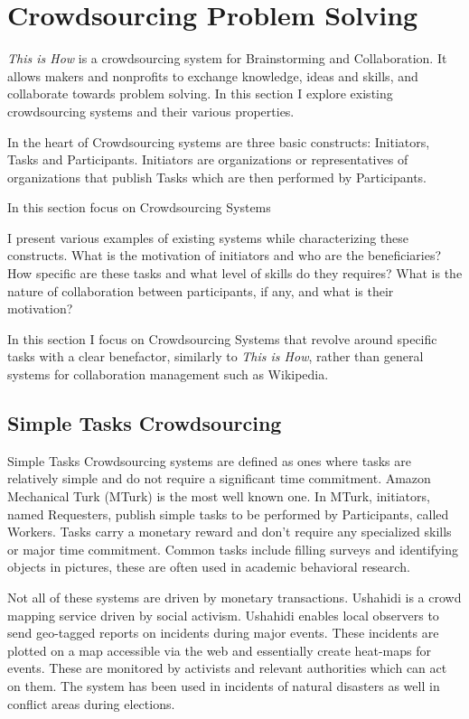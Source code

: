 \section{Crowdsourcing Problem Solving}

\textit{This is How} is a crowdsourcing system for Brainstorming and Collaboration. It allows makers and nonprofits to exchange knowledge, ideas and skills, and collaborate towards problem solving. In this section I explore existing crowdsourcing systems and their various properties.

In the heart of Crowdsourcing systems are three basic constructs: Initiators, Tasks and Participants. Initiators are organizations or representatives of organizations that publish Tasks which are then performed by Participants. 

In this section focus on Crowdsourcing Systems 

I present various examples of existing systems while characterizing these constructs. What is the motivation of initiators and who are the beneficiaries? How specific are these tasks and what level of skills do they requires? What is the nature of collaboration between participants, if any, and what is their motivation?

In this section I focus on Crowdsourcing Systems that revolve around specific tasks with a clear benefactor, similarly to \textit{This is How}, rather than general systems for collaboration management such as Wikipedia.

\subsection{Simple Tasks Crowdsourcing}

Simple Tasks Crowdsourcing systems are defined as ones where tasks are relatively simple and do not require a significant time commitment. Amazon Mechanical Turk (MTurk) \cite{mturk} is the most well known one. In MTurk, initiators, named Requesters, publish simple tasks to be performed by Participants, called Workers. Tasks carry a monetary reward and don't require any specialized skills or major time commitment. Common tasks include filling surveys and  identifying objects in pictures, these are often used in academic behavioral research.  

Not all of these systems are driven by monetary transactions. Ushahidi is a crowd mapping service driven by social activism\cite{ushahidi}. Ushahidi enables local observers to send geo-tagged reports on incidents during major events. These incidents are plotted on a map accessible via the web and essentially create heat-maps for events. These are monitored by activists and relevant authorities which can act on them. The system has been used in incidents of natural disasters as well in conflict areas during elections. 


